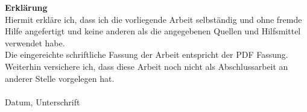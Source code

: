 \noindent \textbf{Erklärung} \\

\noindent Hiermit erkläre ich, dass ich die vorliegende Arbeit selbständig und ohne fremde Hilfe angefertigt und keine anderen als die angegebenen Quellen und Hilfsmittel verwendet habe. \\

\noindent Die eingereichte schriftliche Fassung der Arbeit entspricht der PDF Fassung. \\

\noindent Weiterhin versichere ich, dass diese Arbeit noch nicht als Abschlussarbeit an anderer Stelle vorgelegen hat. \\ \\

\noindent Datum, Unterschrift
